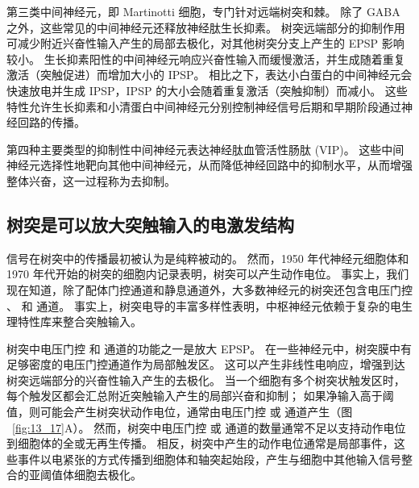 第三类中间神经元，即 Martinotti 细胞，专门针对远端树突和棘。
除了 GABA 之外，这些常见的中间神经元还释放神经肽生长抑素。
树突远端部分的抑制作用可减少附近兴奋性输入产生的局部去极化，对其他树突分支上产生的 EPSP 影响较小。
生长抑素阳性的中间神经元响应兴奋性输入而缓慢激活，并生成随着重复激活（突触促进）而增加大小的 IPSP。 
相比之下，表达小白蛋白的中间神经元会快速放电并生成 IPSP，IPSP 的大小会随着重复激活（突触抑制）而减小。
这些特性允许生长抑素和小清蛋白中间神经元分别控制神经信号后期和早期阶段通过神经回路的传播。


第四种主要类型的抑制性中间神经元表达神经肽血管活性肠肽 (VIP)。
这些中间神经元选择性地靶向其他中间神经元，从而降低神经回路中的抑制水平，从而增强整体兴奋，这一过程称为去抑制。



\subsection{树突是可以放大突触输入的电激发结构}

信号在树突中的传播最初被认为是纯粹被动的。
然而，1950 年代神经元细胞体和 1970 年代开始的树突的细胞内记录表明，树突可以产生动作电位。
事实上，我们现在知道，除了配体门控通道和静息通道外，大多数神经元的树突还包含电压门控 、 和  通道。
事实上，树突电导的丰富多样性表明，中枢神经元依赖于复杂的电生理特性库来整合突触输入。


树突中电压门控  和  通道的功能之一是放大 EPSP。
在一些神经元中，树突膜中有足够密度的电压门控通道作为局部触发区。
这可以产生非线性电响应，增强到达树突远端部分的兴奋性输入产生的去极化。
当一个细胞有多个树突状触发区时，每个触发区都会汇总附近突触输入产生的局部兴奋和抑制；
如果净输入高于阈值，则可能会产生树突状动作电位，通常由电压门控  或  通道产生（图 ~\ref{fig:13_17}A）。
然而，树突中电压门控  或  通道的数量通常不足以支持动作电位到细胞体的全或无再生传播。
相反，树突中产生的动作电位通常是局部事件，这些事件以电紧张的方式传播到细胞体和轴突起始段，产生与细胞中其他输入信号整合的亚阈值体细胞去极化。


